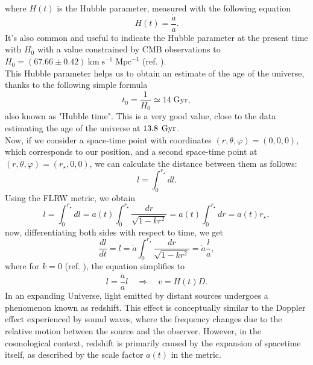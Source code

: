 where $H(t)$ is the Hubble parameter, measured with the following equation
\begin{equation}
    \label{Hubble's parameter}
    H(t) = \frac{\dot{a}}{a}.
\end{equation}
It's also common and useful to indicate the Hubble parameter at the present time with $H_0$ with a value constrained by CMB observations to $H_0 = (67.66 \pm 0.42) \ \text{km} \; \text{s}^{-1} \; \text{Mpc}^{-1}$ (ref. \cite{Planck2020}).\\
This Hubble parameter helps us to obtain an estimate of the age of the universe, thanks to the following simple formula
\begin{equation}
    \label{Hubble time}
    t_0 = \frac{1}{H_0} \simeq 14 \; \text{Gyr},
\end{equation}
also known as "Hubble time". This is a very good value, close to the data estimating the age of the universe at $13.8 \hspace{0.5mm} \; \text{Gyr}$.\\ Now, if we consider a space-time point with coordinates $(r, \theta, \varphi) = (0,0,0)$, which corresponds to our position, and a second space-time point at $(r, \theta, \varphi) = (r_\star, 0, 0)$, we can calculate the distance between them as follows:
\begin{equation}
    l = \int_{0} ^{r_\star} dl.
\end{equation}
Using the FLRW metric, we obtain
\begin{equation}
    l = \int_{0} ^{r_\star} dl = a(t) \int_{0} ^{r_\star} \frac{dr}{\sqrt{1-kr^2}} = a(t) \int_{0} ^{r_\star} dr = a(t)r_ \star,
\end{equation}
now, differentiating both sides with respect to time, we get
\begin{equation}
    \frac{dl}{dt} = \dot{l}=\dot{a} \int_{0} ^{r_\star} \frac{dr}{\sqrt{1-kr^2}} = \dot{a} \frac{l}{a},
\end{equation}
where for $k=0$ (ref. \cite{de_Bernardis_2000}), the equation simplifies to
\begin{equation}
    \dot{l} = \frac{\dot{a}}{a}l \quad \Longrightarrow \quad v = H(t) D.
\end{equation}
In an expanding Universe, light emitted by distant sources undergoes a phenomenon known as redshift. This effect is conceptually similar to the Doppler effect experienced by sound waves, where the frequency changes due to the relative motion between the source and the observer. However, in the cosmological context, redshift is primarily caused by the expansion of spacetime itself, as described by the scale factor \( a(t) \) in the metric.

